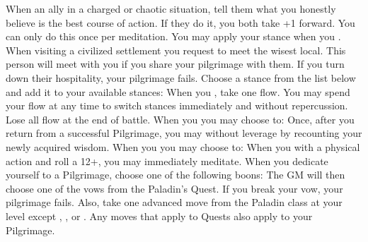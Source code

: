 \documentclass[darkmode]{dw_playbook}
\begin{document}
    {
            {When an ally  in a charged or chaotic situation, tell them what you honestly believe is the best course of action.  If they do it, you both take +1 forward.  You can only do this once per meditation.}
        \gap
            {You may apply your stance when you .}
        \gap
            {When visiting a civilized settlement you request to meet the wisest local. This person will meet with you if you share your pilgrimage with them.  If you turn down their hospitality, your pilgrimage fails.}
        \gap
            {Choose a stance from the list below and add it to your available stances:
            \gapSm
            \gapSm
            \gapSm
            }
        \gap
            {When you , take one flow.  You may spend your flow at any time to switch stances immediately and without repercussion.  Lose all flow at the end of battle.}
        \gap
            {When you  you may choose to:
            \gapSm
            }
            {Once, after you return from a successful Pilgrimage, you may  without leverage by recounting your newly acquired wisdom.}
        \gap
            {When you  you may choose to:
            \gapSm
            }
        \gap
            {When you  with a physical action and roll a 12+, you may immediately meditate.}
        \gap
            {When you dedicate yourself to a Pilgrimage, choose one of the following boons:
            \gapSm
            \gapSm
            \gapSm
            \gapSm
            The GM will then choose one of the vows from the Paladin’s Quest.  If you break your vow, your pilgrimage fails.
            \gapSm
            Also, take one advanced move from the Paladin class at your level except , , or .  Any moves that apply to Quests also apply to your Pilgrimage.}
    }
\end{document}
